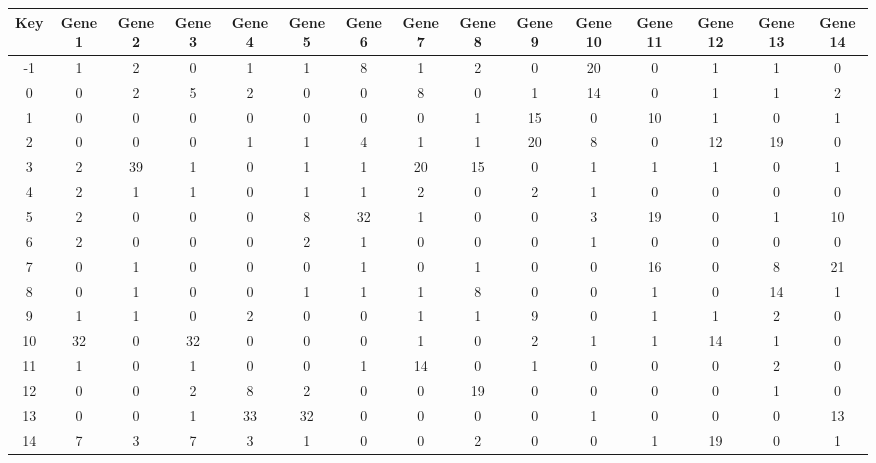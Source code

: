 \begin{tabular}{|c|c|c|c|c|c|c|c|c|c|c|c|c|c|c|}
\hline
Key & Gene 1 & Gene 2 & Gene 3 & Gene 4 & Gene 5 & Gene 6 & Gene 7 & Gene 8 & Gene 9 & Gene 10 & Gene 11 & Gene 12 & Gene 13 & Gene 14 \\
\hline
-1 & 1 & 2 & 0 & 1 & 1 & 8 & 1 & 2 & 0 & 20 & 0 & 1 & 1 & 0 \\
0 & 0 & 2 & 5 & 2 & 0 & 0 & 8 & 0 & 1 & 14 & 0 & 1 & 1 & 2 \\
1 & 0 & 0 & 0 & 0 & 0 & 0 & 0 & 1 & 15 & 0 & 10 & 1 & 0 & 1 \\
2 & 0 & 0 & 0 & 1 & 1 & 4 & 1 & 1 & 20 & 8 & 0 & 12 & 19 & 0 \\
3 & 2 & 39 & 1 & 0 & 1 & 1 & 20 & 15 & 0 & 1 & 1 & 1 & 0 & 1 \\
4 & 2 & 1 & 1 & 0 & 1 & 1 & 2 & 0 & 2 & 1 & 0 & 0 & 0 & 0 \\
5 & 2 & 0 & 0 & 0 & 8 & 32 & 1 & 0 & 0 & 3 & 19 & 0 & 1 & 10 \\
6 & 2 & 0 & 0 & 0 & 2 & 1 & 0 & 0 & 0 & 1 & 0 & 0 & 0 & 0 \\
7 & 0 & 1 & 0 & 0 & 0 & 1 & 0 & 1 & 0 & 0 & 16 & 0 & 8 & 21 \\
8 & 0 & 1 & 0 & 0 & 1 & 1 & 1 & 8 & 0 & 0 & 1 & 0 & 14 & 1 \\
9 & 1 & 1 & 0 & 2 & 0 & 0 & 1 & 1 & 9 & 0 & 1 & 1 & 2 & 0 \\
10 & 32 & 0 & 32 & 0 & 0 & 0 & 1 & 0 & 2 & 1 & 1 & 14 & 1 & 0 \\
11 & 1 & 0 & 1 & 0 & 0 & 1 & 14 & 0 & 1 & 0 & 0 & 0 & 2 & 0 \\
12 & 0 & 0 & 2 & 8 & 2 & 0 & 0 & 19 & 0 & 0 & 0 & 0 & 1 & 0 \\
13 & 0 & 0 & 1 & 33 & 32 & 0 & 0 & 0 & 0 & 1 & 0 & 0 & 0 & 13 \\
14 & 7 & 3 & 7 & 3 & 1 & 0 & 0 & 2 & 0 & 0 & 1 & 19 & 0 & 1 \\
\hline
\end{tabular}